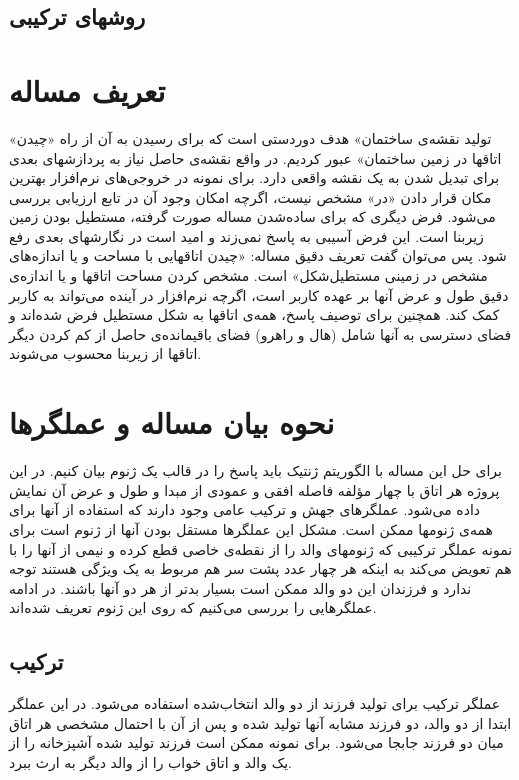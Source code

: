\documentclass{report}
\begin{document}
\subsection{روشهای ترکیبی}

\section{تعریف مساله}
«تولید نقشه‌ی ساختمان» هدف دوردستی است که برای رسیدن به آن از راه «چیدن اتاقها در زمین ساختمان» عبور کردیم. در واقع نقشه‌ی حاصل نیاز به پردازشهای بعدی برای تبدیل شدن به یک نقشه واقعی دارد. برای نمونه در خروجی‌های نرم‌افزار بهترین مکان قرار دادن «در» مشخص نیست، اگرچه امکان وجود آن در تابع ارزیابی بررسی می‌شود. فرض دیگری که برای ساده‌شدن مساله صورت گرفته، مستطیل بودن زمین زیربنا است. این فرض آسیبی به پاسخ نمی‌زند و امید است در نگارشهای بعدی رفع شود.
پس می‌توان گفت تعریف دقیق مساله: «چیدن اتاقهایی با مساحت و یا اندازه‌های مشخص در زمینی مستطیل‌شکل» است. مشخص کردن مساحت اتاقها و یا اندازه‌ی دقیق طول و عرض آنها بر عهده کاربر است، اگرچه نرم‌افزار در آینده می‌تواند به کاربر کمک کند.
همچنین برای توصیف پاسخ، همه‌ی اتاقها به شکل مستطیل فرض شده‌اند و فضای دسترسی به آنها شامل (هال و راهرو) فضای باقیمانده‌ی حاصل از کم کردن دیگر اتاقها از زیربنا محسوب می‌شوند. 

\section{نحوه بیان مساله و عملگرها}
برای حل این مساله با الگوریتم ژنتیک باید پاسخ را در قالب یک ژنوم بیان کنیم. در این پروژه هر اتاق با چهار مؤلفه فاصله افقی و عمودی از مبدا و طول و عرض آن نمایش داده می‌شود. عملگرهای جهش و ترکیب عامی وجود دارند که استفاده از آنها برای همه‌ی ژنومها ممکن است. مشکل این عملگرها مستقل بودن آنها از ژنوم است برای نمونه عملگر ترکیبی که ژنومهای والد را از نقطه‌ی خاصی قطع کرده و نیمی از آنها را با هم تعویض می‌کند به اینکه هر چهار عدد پشت سر هم مربوط به یک ویژگی هستند توجه ندارد و فرزندان این دو والد ممکن است بسیار بدتر از هر دو آنها باشند. در ادامه عملگرهایی را بررسی می‌کنیم که روی این ژنوم تعریف شده‌اند.
\subsection{ترکیب}
عملگر ترکیب برای تولید فرزند از دو والد انتخاب‌شده استفاده می‌شود. در این عملگر ابتدا از دو والد، دو فرزند مشابه آنها تولید شده و پس از آن با احتمال مشخصی هر اتاق میان دو فرزند جابجا می‌شود. برای نمونه ممکن است فرزند تولید شده آشپزخانه را از یک والد و اتاق خواب را از والد دیگر به ارث ببرد.
\end{document}
